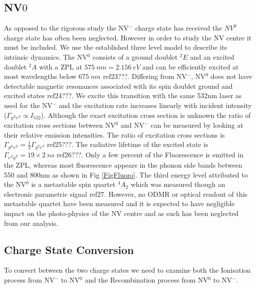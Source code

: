 \documentclass[preprint,prl]{revtex4}
\begin{document}
\subsection{NV$0$}

As opposed to the rigorous study the NV$^-$ charge state has received the $NV^0$ charge state has often been neglected. However in order to study the NV centre it must be included. We use the established three level model to describe its intrinsic dynamics. The NV$^0$ consists of a ground doublet $^2E$ and an excited doublet $^2A$ with a ZPL at $\SI{575}{nm} = \SI{2.156}{eV}$  and can be efficiently excited at most wavelengths below $\SI{675}{nm}$ ref23???. Differing from NV$^-$, NV$^0$ does not have detectable magnetic resonances associated with its spin doublet ground and excited states ref24???. We excite this transition with the same 532nm laser as used for the NV$^-$ and the excitation rate increases linearly with incident intensity ($\Gamma_{g^Ze^Z} \propto I_{532}$). Although the exact excitation cross section is unknown the ratio of excitation cross sections between NV$^0$ and NV$^-$ can be measured by looking at their relative emission intensities. The ratio of excitation cross sections is $\Gamma_{g^Ze^Z} = \frac{1}{3} \Gamma_{g^Te^T}$ ref25???. The radiative lifetime of the excited state is $\Gamma_{e^Zg^Z} = 19\times2 \SI{}{ns}$ ref26???.  
 Only a few percent of the Fluorescence is emitted in the ZPL, whereas most fluorescence appears in the phonon side bands between 550 and 800nm as shown in Fig \ref{FigFluoro}. The third energy level attributed to the NV$^0$ is a metastable spin quartet $^4A_2$ which was measured though an electronic parametric signal ref27. However, no ODMR or optical readout of this metastable quartet have been measured and it is expected to have negligible impact on the photo-physics of the NV centre and as such has been neglected from our analysis. 

\subsection{Charge State Conversion}
To convert between the two charge states we need to examine both the Ionisation process from NV$^-$ to NV$^0$ and  the Recombination process from NV$^0$ to NV$^-$.
\end{document}
